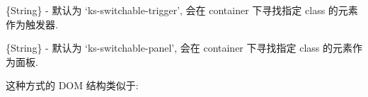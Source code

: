 \documentclass[letterpaper,10pt,english]{sphinxmanual}
\begin{document}

\begin{fulllineitems}
\label{api/component/switchable/switchable:Switchable.triggerCls}
\{String\} - 默认为 `ks-switchable-trigger', 会在 container 下寻找指定 class 的元素作为触发器.

\end{fulllineitems}



\begin{fulllineitems}
\label{api/component/switchable/switchable:Switchable.panelCls}
\{String\} - 默认为 `ks-switchable-panel', 会在 container 下寻找指定 class 的元素作为面板.

这种方式的 DOM 结构类似于:


\end{fulllineitems}
\end{document}
